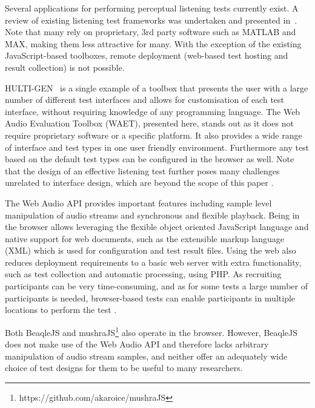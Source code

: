 \documentclass{sig-alternate}
\begin{document}

	Several applications for performing perceptual listening tests currently exist. A review of existing listening test frameworks was undertaken and presented in~. Note that many rely on proprietary, 3rd party software such as MATLAB and MAX, making them less attractive for many. With the exception of the existing JavaScript-based toolboxes, remote deployment (web-based test hosting and result collection) is not possible. 
	
	HULTI-GEN~\cite{hultigen} is a single example of a toolbox that presents the user with a large number of different test interfaces and allows for customisation of each test interface, without requiring knowledge of any programming language. The Web Audio Evaluation Toolbox (WAET), presented here, stands out as it does not require proprietary software or a specific platform. It also provides a wide range of interface and test types in one user friendly environment. Furthermore any test based on the default test types can be configured in the browser as well. Note that the design of an effective listening test further poses many challenges unrelated to interface design, which are beyond the scope of this paper \cite{bech}. 

	The Web Audio API provides important features including sample level manipulation of audio streams \cite{schoeffler2015mushra} and synchronous and flexible playback. Being in the browser allows leveraging the flexible object oriented JavaScript language and native support for web documents, such as the extensible markup language (XML) which is used for configuration and test result files. Using the web also reduces deployment requirements to a basic web server with extra functionality, such as test collection and automatic processing, using PHP. As recruiting participants can be very time-consuming, and as for some tests a large number of participants is needed, browser-based tests can enable participants in multiple locations to perform the test \cite{schoeffler2015mushra}.

	Both BeaqleJS \cite{beaqlejs} and mushraJS\footnote{https://github.com/akaroice/mushraJS} also operate in the browser. However, BeaqleJS does not make use of the Web Audio API and therefore lacks arbitrary manipulation of audio stream samples, and neither offer an adequately wide choice of test designs for them to be useful to many researchers. %
	
\end{document}
